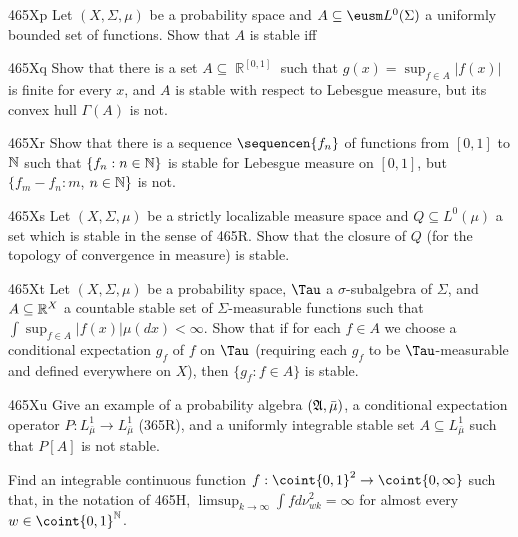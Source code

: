 {\spheader 465Xp Let $(X,\Sigma,\mu)$ be a probability space and
$A\subseteq\eusm L^0(\Sigma)$ a uniformly bounded set of functions.
Show that $A$ is stable iff


\spheader 465Xq Show that there is a set $A\subseteq\BbbR^{[0,1]}$ such
that $g(x)=\sup_{f\in A}|f(x)|$ is finite for every $x$, and $A$ is
stable with respect to Lebesgue measure, but its convex hull $\Gamma(A)$
is not.   

\spheader 465Xr Show that there is a sequence $\sequencen{f_n}$ of
functions from $[0,1]$ to $\Bbb N$ such that $\{f_n:n\in\Bbb N\}$ is stable
for Lebesgue measure on $[0,1]$, but $\{f_m-f_n:m$, $n\in\Bbb N\}$ is not.

\spheader 465Xs Let $(X,\Sigma,\mu)$ be a strictly localizable measure
space and $Q\subseteq L^0(\mu)$ a set which is stable in the sense of
465R.  Show that the closure of $Q$ (for the topology of convergence in
measure) is stable.   

\spheader 465Xt Let $(X,\Sigma,\mu)$ be a probability space, $\Tau$ a
$\sigma$-subalgebra of $\Sigma$, and $A\subseteq\Bbb R^X$ a countable
stable set of $\Sigma$-measurable functions such that
$\int\sup_{f\in A}|f(x)|\mu(dx)<\infty$.   Show that if for each
$f\in A$ we choose a conditional expectation $g_f$ of $f$ on $\Tau$
(requiring
each $g_f$ to be $\Tau$-measurable and defined everywhere on $X$), then
$\{g_f:f\in A\}$ is stable.

\spheader 465Xu Give an example of a probability algebra
$(\frak A,\bar\mu)$, a conditional expectation operator
$P:L^1_{\bar\mu}\to L^1_{\bar\mu}$ (365R), and a uniformly integrable
stable set $A\subseteq L^1_{\bar\mu}$ such that $P[A]$ is not stable.

Find an integrable continuous function
$f:\coint{0,1}^2\to\coint{0,\infty}$ such that, in the notation of
465H, $\limsup_{k\to\infty}\int fd\nu_{wk}^2=\infty$ for almost every
$w\in\coint{0,1}^{\Bbb N}$.   

}
